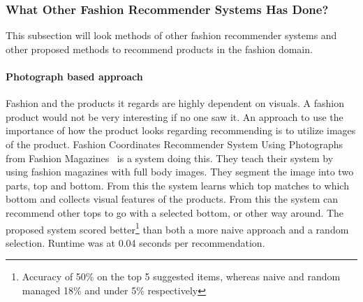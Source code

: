 
\subsubsection{What Other Fashion Recommender Systems Has Done?}

This subsection will look methods of other fashion recommender systems and
other proposed methods to recommend products in the fashion domain.

\paragraph{Photograph based approach}
Fashion and the products it regards are highly dependent on visuals.  A fashion
product would not be very interesting if no one saw it.  An approach to use the
importance of how the product looks regarding recommending is to utilize images
of the product.  Fashion Coordinates Recommender System Using Photographs from
Fashion Magazines~\cite{Iwata:2011} is a system doing this.  They teach their
system by using fashion magazines with full body images.  They segment the
image into two parts, top and bottom.  From this the system learns which top
matches to which bottom and collects visual features of the products.  From
this the system can recommend other tops to go with a selected bottom, or other
way around.  The proposed system scored better\footnote{Accuracy of 50\% on the
top 5 suggested items, whereas naive and random managed 18\% and under 5\%
respectively} than both a more naive approach and a random selection.  Runtime
was at 0.04 seconds per recommendation.

